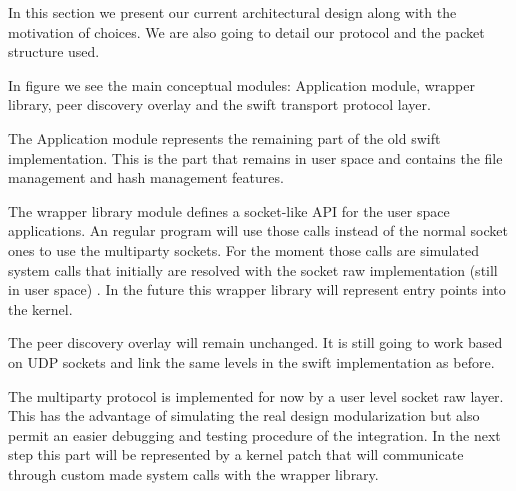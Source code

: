 

In this section we present our current architectural design along with the motivation of choices. We are also going to 
detail our protocol and the packet structure used.

In figure  we see the main conceptual modules: Application module, 
wrapper library, peer discovery overlay and the swift transport protocol layer.


The Application module represents the remaining part of the old swift implementation. This is the part that remains in
user space and contains the file management and hash management features. 

The wrapper library module defines a socket-like API for the user space applications. An regular program will use those
calls instead of the normal socket ones to use the multiparty sockets. For the moment those calls are simulated system
calls that initially are resolved with the socket raw implementation (still in user space) . 
In the future this wrapper library will represent entry points into the kernel.

The peer discovery overlay will remain unchanged. It is still going to work based on UDP sockets and link the same
levels in the swift implementation as before. 

The multiparty protocol is implemented for now by a user level socket raw layer. This has the advantage of simulating the
real design modularization but also permit an easier debugging and testing procedure of the integration. In the next step
this part will be represented by a kernel patch that will communicate through custom made system calls with the wrapper
library. 


\begin{comment}
In this picture we try to define more which elements are in US and which are in KS. 
In the first implementation we will make an US implementation for our protocol with raw socket to validate our architecture 
and to make easier our kernel implementation that will communicate with this implementation.  

Raw socket implementation will support all syscalls and it will be a copy of our kernel implementation. 
This implementation will have the same API and behavior with kernel implementation. The peer discover will be in 
Application implementation and it will be developer problems how to implement and how to manage it. 
When you make a syscall you need to pass the ips where the protocol can find the specify hash 

In the first implementation a swift socket will be available for only one operation transmit data or receive data.  
In the last implementation the swift protocol will be develop in kernel space, and it will be accessible with a datagram 
socket that will support all socket syscalls. It will intend to support both operations (receive/ send) data over only one socket.
\end{comment}